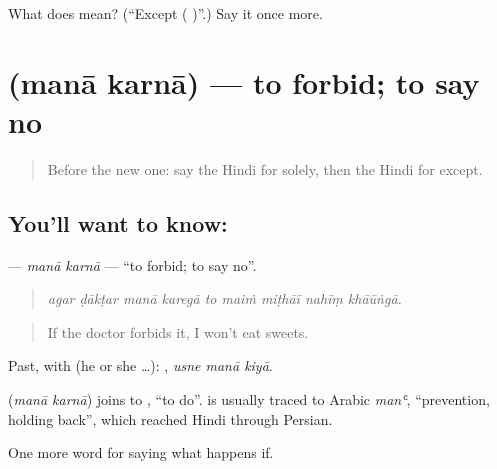 \begin{tcolorbox}[breakable,colback=teal!4,colframe=teal!35!black,title={Before you move on}]
What does  mean? (\textquotedblleft{}Except ( )\textquotedblright{}.) Say it once more.
\end{tcolorbox}
\section[\texorpdfstring{\hi{मना} \hi{करना} (manā karnā)}{मना करना (manā karnā)}]{  (manā karnā) — to forbid; to say no}

\label{lesson:HI-C378-manakarna}



\begin{quote}
Before the new one: say the Hindi for solely, then the Hindi for except.
\end{quote}

\subsection*{You'll want to know:  }
\textbf{ } — \emph{manā karnā} — \textquotedblleft{}to forbid; to say no\textquotedblright{}.

\begin{quote}
        
\end{quote}

\begin{quote}
\emph{agar ḍākṭar manā karegā to maiṁ miṭhāī nahīṃ khāūṅgā.}
\end{quote}

\begin{quote}
If the doctor forbids it, I won't eat sweets.
\end{quote}

Past, with  (he or she …):   , \emph{usne manā kiyā}.

\begin{cousinweb}
\textbf{ } (\emph{manā karnā}) joins  to , \textquotedblleft{}to do\textquotedblright{}.  is usually traced to Arabic \emph{manʿ}, \textquotedblleft{}prevention, holding back\textquotedblright{}, which reached Hindi through Persian.
\end{cousinweb}

\begin{grammarlens}[title={What you've built}]
One more word for saying what happens if.
\end{grammarlens}

